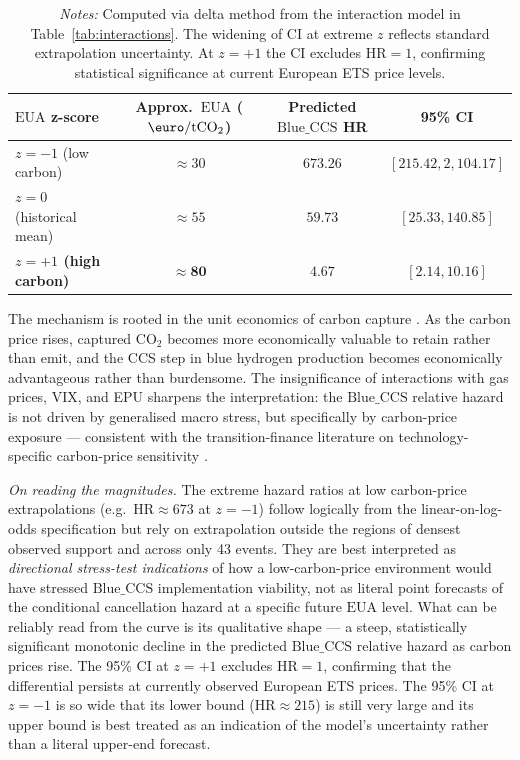 \documentclass[review,authoryear,11pt]{elsarticle}
\newcommand{\HR}{\mathrm{HR}}
\newcommand{\BlueCCS}{\mathrm{Blue\_CCS}}
\newcommand{\EUA}{\mathrm{EUA}}
\begin{document}
\begin{table}[H]
\centering
\caption{Predicted $\BlueCCS$ hazard ratio at key carbon-price levels.}
\label{tab:eua_levels}
\small
\begin{tabular}{lccc}
\toprule
\textbf{$\EUA$ z-score} & \textbf{Approx.\ $\EUA$ ($\text{\euro}/\mathrm{tCO}_2$)} & \textbf{Predicted $\BlueCCS$ HR} & \textbf{95\% CI} \\
\midrule
$z = -1$ (low carbon) & $\approx 30$ & $673.26$ & $[215.42, 2{,}104.17]$ \\
$z = 0$ (historical mean) & $\approx 55$ & $59.73$ & $[25.33, 140.85]$ \\
\textbf{$z = +1$ (high carbon)} & $\mathbf{\approx 80}$ & $\mathbf{4.67}$ & $\mathbf{[2.14, 10.16]}$ \\
\bottomrule
\end{tabular}
\caption*{\footnotesize \textit{Notes:} Computed via delta method from the interaction model in Table~\ref{tab:interactions}. The widening of CI at extreme $z$ reflects standard extrapolation uncertainty. At $z = +1$ the CI excludes $\HR = 1$, confirming statistical significance at current European ETS price levels.}
\end{table}

The mechanism is rooted in the unit economics of carbon capture \citep{Bui2018, Budinis2018}. As the carbon price rises, captured $\mathrm{CO}_2$ becomes more economically valuable to retain rather than emit, and the CCS step in blue hydrogen production becomes economically advantageous rather than burdensome. The insignificance of interactions with gas prices, VIX, and EPU sharpens the interpretation: the $\BlueCCS$ relative hazard is not driven by generalised macro stress, but specifically by carbon-price exposure --- consistent with the transition-finance literature on technology-specific carbon-price sensitivity \citep{BoltonKacperczyk2021, Mercure2018}.

\textit{On reading the magnitudes.} The extreme hazard ratios at low carbon-price extrapolations (e.g.\ $\HR \approx 673$ at $z = -1$) follow logically from the linear-on-log-odds specification but rely on extrapolation outside the regions of densest observed support and across only 43 events. They are best interpreted as \textit{directional stress-test indications} of how a low-carbon-price environment would have stressed $\BlueCCS$ implementation viability, not as literal point forecasts of the conditional cancellation hazard at a specific future $\EUA$ level. What can be reliably read from the curve is its qualitative shape --- a steep, statistically significant monotonic decline in the predicted $\BlueCCS$ relative hazard as carbon prices rise. The 95\% CI at $z = +1$ excludes $\HR = 1$, confirming that the differential persists at currently observed European ETS prices. The 95\% CI at $z = -1$ is so wide that its lower bound ($\HR \approx 215$) is still very large and its upper bound is best treated as an indication of the model's uncertainty rather than a literal upper-end forecast.
\end{document}
